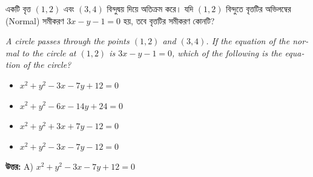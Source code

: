 \documentclass[12pt, a4paper]{article}
\begin{document}
\begin{tcolorbox}[questionbox={প্রশ্ন (Question) 16}]
    \noindent
    একটি বৃত্ত $(1, 2)$ এবং $(3, 4)$ বিন্দুদ্বয় দিয়ে অতিক্রম করে। যদি $(1, 2)$ বিন্দুতে বৃত্তটির অভিলম্বের (Normal) সমীকরণ $3x - y - 1 = 0$ হয়, তবে বৃত্তটির সমীকরণ কোনটি?
    
    \vspace{0.8em}
    \begin{english}
    \noindent\textit{\color{darkgray}
    A circle passes through the points $(1, 2)$ and $(3, 4)$. If the equation of the normal to the circle at $(1, 2)$ is $3x - y - 1 = 0$, which of the following is the equation of the circle?
    }
    \end{english}
\end{tcolorbox}

\begin{itemize}[label={}, leftmargin=1cm, itemsep=0.5em]
    \item[\textbf{A)}] $x^2 + y^2 - 3x - 7y + 12 = 0$
    \item[\textbf{B)}] $x^2 + y^2 - 6x - 14y + 24 = 0$
    \item[\textbf{C)}] $x^2 + y^2 + 3x + 7y - 12 = 0$
    \item[\textbf{D)}] $x^2 + y^2 - 3x - 7y - 12 = 0$
\end{itemize}

\vspace{0.5em}
\begin{tcolorbox}[answerbox]
    \textbf{\color{success} উত্তর:} A) $x^2 + y^2 - 3x - 7y + 12 = 0$
\end{tcolorbox}
\vspace{1em}
\end{document}
